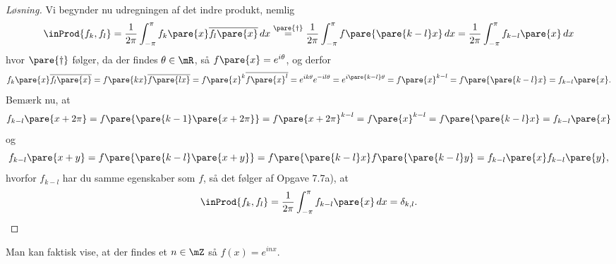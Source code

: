 \begin{opg}
\begin{enumerate}
\begin{proof}[Løsning]
    Vi begynder nu udregningen af det indre produkt, nemlig
    $$ \inProd{f_k,f_l} = \frac{1}{2\pi}\int_{-\pi}^\pi 
            f_k\pare{x}\overline{f_l\pare{x}} \, dx
        \overset{\pare{\dagger}}{=} \frac{1}{2\pi}\int_{-\pi}^\pi 
            f\pare{\pare{k-l}x} \, dx
        = \frac{1}{2\pi}\int_{-\pi}^\pi f_{k-l}\pare{x} \, dx $$
    hvor $\pare{\dagger}$ følger, da der findes $\theta\in\mR$, så $f\pare{x} = e^{i\theta}$, og derfor
    $$ f_k\pare{x}\overline{f_l\pare{x}} = f\pare{kx}\overline{f\pare{lx}}
        = f\pare{x}^k\overline{f\pare{x}^l} = e^{ik\theta}e^{-il\theta}
        = e^{i\pare{k-l}\theta} = f\pare{x}^{k-l} = f\pare{\pare{k-l}x} = f_{k-l}\pare{x}. $$
    Bemærk nu, at 
    $$ f_{k-l}\pare{x + 2\pi} = f\pare{\pare{k-1}\pare{x+2\pi}}
        = f\pare{x+2\pi}^{k-l} = f\pare{x}^{k-l} = f\pare{\pare{k-l}x} = f_{k-l}\pare{x} $$
    og 
    $$ f_{k-l}\pare{x+y} = f\pare{\pare{k-l}\pare{x+y}} = f\pare{\pare{k-l}x}f\pare{\pare{k-l}y} = f_{k-l}\pare{x}f_{k-l}\pare{y}, $$
    hvorfor $f_{k-l}$ har du samme egenskaber som $f$, så det følger af Opgave 7.7a), at
    $$ \inProd{f_k,f_l} =\frac{1}{2\pi}\int_{-\pi}^\pi f_{k-l}\pare{x} \, dx
        = \delta_{k,l}. $$
    \end{proof}\fi
\end{enumerate}
Man kan faktisk vise, at der findes et $n \in \mZ$ så $f(x) = e^{inx}$.
\end{opg}